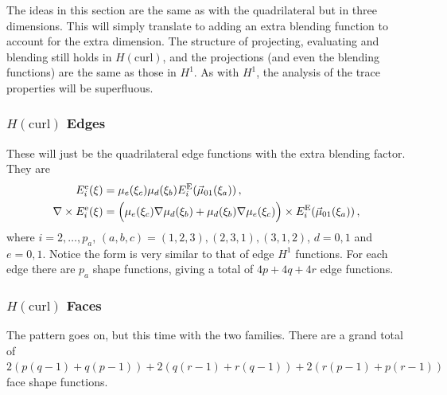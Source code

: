 The ideas in this section are the same as with the quadrilateral but in three dimensions. 
This will simply translate to adding an extra blending function to account for the extra dimension.
The structure of projecting, evaluating and blending still holds in $H(\mathrm{curl})$, and the projections (and even the blending functions) are the same as those in $H^1$.
As with $H^1$, the analysis of the trace properties will be superfluous.

\subsubsection{\texorpdfstring{$H(\mathrm{curl})$}{Hcurl} Edges}
These will just be the quadrilateral edge functions with the extra blending factor. They are
\begin{equation}
	\begin{aligned}
		E_i^\mathrm{e}(\xi)&=\mu_e(\xi_c)\mu_d(\xi_b)E_i^{\mathrm{E}}(\vec{\mu}_{01}(\xi_a))\,,\\
		\nabla\times E_i^\mathrm{e}(\xi)&=
			\Big(\mu_e(\xi_c)\nabla\mu_d(\xi_b)+\mu_d(\xi_b)\nabla\mu_e(\xi_c)\Big)\times E_i^{\mathrm{E}}(\vec{\mu}_{01}(\xi_a))\,,
	\end{aligned}
\end{equation}
where $i=2,\ldots,p_a$, $(a,b,c)=(1,2,3),(2,3,1),(3,1,2)$, $d=0,1$ and $e=0,1$.
Notice the form is very similar to that of edge $H^1$ functions. 
For each edge there are $p_a$ shape functions, giving a total of $4p+4q+4r$ edge functions. 


\subsubsection{\texorpdfstring{$H(\mathrm{curl})$}{Hcurl} Faces}

The pattern goes on, but this time with the two families.
There are a grand total of $2(p(q-1)+q(p-1))+2(q(r-1)+r(q-1))+2(r(p-1)+p(r-1))$ face shape functions.

